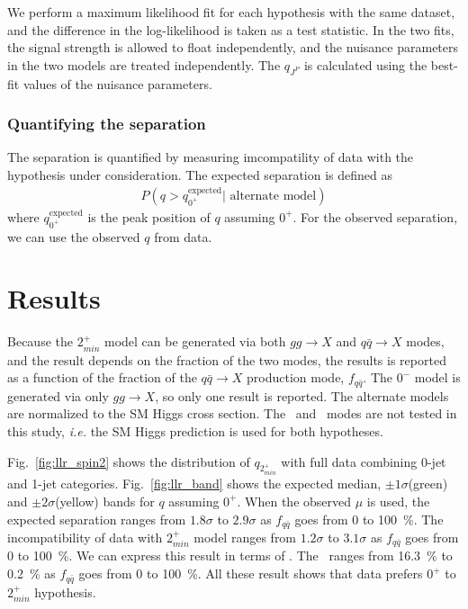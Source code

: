 We perform a maximum likelihood fit for each hypothesis with the same dataset,
and the difference in the log-likelihood is taken as a test statistic. 
In the two fits, the signal strength is allowed to float independently, 
and the nuisance parameters in the two models are treated independently. 
The $q_{J^P}$ is calculated using the best-fit values of the nuisance parameters. 

\subsubsection{Quantifying the separation}

The separation is quantified by measuring imcompatility of data with 
the hypothesis under consideration. The expected separation is defined as  
\begin{eqnarray} 
P(q > q_{0^+}^{\textrm{expected}} | \textrm{ alternate model}) 
\end{eqnarray} 
where $q_{0^+}^{\textrm{expected}}$ is the peak position of $q$ assuming $0^+$.
For the observed separation, we can use the observed $q$ from data. 

\section{Results}

Because the $2_{min}^+$ model can be generated via both $gg\rightarrow X$ 
and $q\bar{q }\rightarrow X$ modes, and the result depends on the fraction of the two modes, 
the results is reported as a function of the fraction of the $q\bar{q} \rightarrow X$ production mode, 
$f_{q\bar{q}}$. The $0^-$ model is generated via only $gg\rightarrow X$,
so only one result is reported. The alternate models are normalized to the 
SM Higgs cross section. The \qqH\ and \qqVH\ modes are not tested in this study, 
\textit{i.e.} the SM Higgs prediction is used for both hypotheses. 

Fig.~\ref{fig:llr_spin2} shows the distribution of $q_{2_{min}^+}$ with full data 
combining 0-jet and 1-jet categories. 
Fig.~\ref{fig:llr_band} shows the expected median, $\pm1\sigma$(green) 
and  $\pm2\sigma$(yellow) bands for $q$ assuming $0^+$. 
When the observed $\mu$ is used, the expected separation ranges from 
$1.8\sigma$ to $2.9\sigma$ as $f_{q\bar{q}}$ goes from 0 to 100~\%.
The incompatibility of data with $2_{min}^+$ model ranges from  
$1.2\sigma$ to $3.1\sigma$ as $f_{q\bar{q}}$ goes from 0 to 100~\%.
We can express this result in terms of \CLs. The \CLs\ ranges from 
16.3~\% to 0.2~\% as $f_{q\bar{q}}$ goes from 0 to 100~\%.
All these result shows that data prefers $0^+$ to $2_{min}^+$ hypothesis.  

